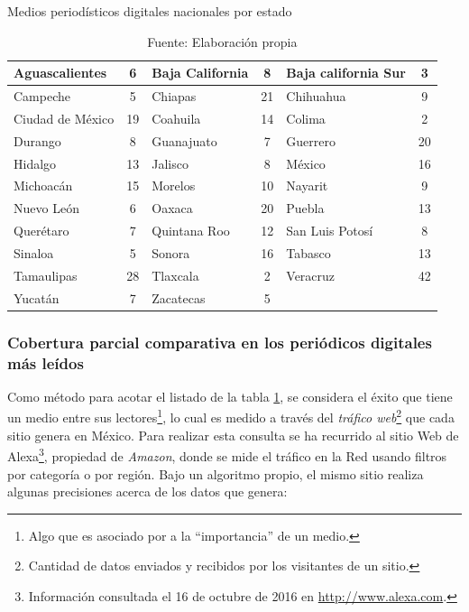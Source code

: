\documentclass[letterpaper, 11pt]{book}
\theoremstyle{definition}
\theoremstyle{remark}
\begin{document}
\begin{table}[!hbt]
\center
\small
\caption{Medios periodísticos digitales nacionales por estado}
\label{DiariosDigitales}
\begin{tabular}{ | l | c || l | c || l | c | } 
\hline
Aguascalientes & 6 & Baja California & 8 & Baja california Sur & 3 \\
\hline
Campeche & 5 & Chiapas	& 21 & Chihuahua & 9\\
\hline
Ciudad de México & 19 & Coahuila & 14 & Colima & 2 \\
\hline
Durango & 8 & Guanajuato & 7 & Guerrero & 20\\
\hline
Hidalgo & 13 & Jalisco & 8 & México & 16 \\
\hline
Michoacán & 15 & Morelos & 10 & Nayarit & 9\\
\hline
Nuevo León & 6 & Oaxaca & 20 & Puebla & 13 \\
\hline
Querétaro & 7 & Quintana Roo & 12 & San Luis Potosí & 8\\
\hline
Sinaloa & 5 & Sonora & 16 & Tabasco & 13 \\
\hline
Tamaulipas & 28 & Tlaxcala & 2 & Veracruz & 42\\
\hline
Yucatán & 7 & Zacatecas & 5 & &\\
\hline
\end{tabular}
\par\bigskip
\caption*{\small Fuente: Elaboración propia}
\end{table}


\subsubsection{Cobertura parcial comparativa en los periódicos digitales más leídos}
\label{sec:Mediosnacionales_CoberturaComparativa}


Como método para acotar el listado de la tabla \ref{DiariosDigitales}, se considera el éxito que tiene un medio entre sus lectores\footnote{
Algo que es asociado por \citet{2003_Wada_Tesis} a la ``importancia'' de un medio.}, lo cual es medido a través del \emph{tráfico web}\footnote{Cantidad de datos enviados y recibidos por los visitantes de un sitio.} que cada sitio genera en México. 
Para realizar esta consulta se ha recurrido al sitio Web de Alexa\footnote{
Información consultada el 16 de octubre de 2016 en \url{http://www.alexa.com}.}, propiedad de \emph{Amazon}, donde se mide el tráfico en la Red usando filtros por categoría o por región. Bajo un algoritmo propio, el mismo sitio realiza algunas precisiones acerca de los datos que genera:
\end{document}
